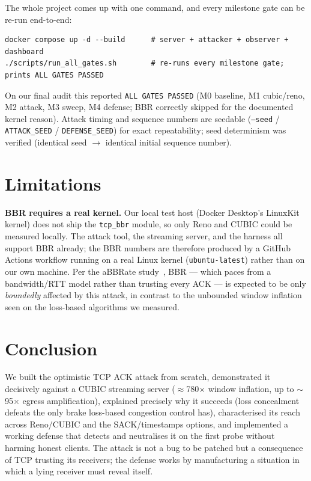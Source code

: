 \documentclass[11pt,a4paper]{article}
\begin{document}
The whole project comes up with one command, and every milestone gate can be re-run
end-to-end:
\begin{lstlisting}[style=codebox]
docker compose up -d --build      # server + attacker + observer + dashboard
./scripts/run_all_gates.sh        # re-runs every milestone gate; prints ALL GATES PASSED
\end{lstlisting}
On our final audit this reported \texttt{ALL GATES PASSED} (M0 baseline, M1 cubic/reno,
M2 attack, M3 sweep, M4 defense; BBR correctly skipped for the documented kernel reason).
Attack timing and sequence numbers are seedable (\texttt{--seed} / \texttt{ATTACK\_SEED} /
\texttt{DEFENSE\_SEED}) for exact repeatability; seed determinism was verified (identical
seed $\rightarrow$ identical initial sequence number).

\section{Limitations}
\textbf{BBR requires a real kernel.} Our local test host (Docker Desktop's LinuxKit
kernel) does not ship the \texttt{tcp\_bbr} module, so only Reno and CUBIC could be
measured locally. The attack tool, the streaming server, and the harness all support BBR
already; the BBR numbers are therefore produced by a GitHub Actions workflow running on a
real Linux kernel (\texttt{ubuntu-latest}) rather than on our own machine. Per the
aBBRate study~\cite{abbrate}, BBR --- which paces from a bandwidth/RTT model rather than
trusting every ACK --- is expected to be only \emph{boundedly} affected by this attack,
in contrast to the unbounded window inflation seen on the loss-based algorithms we
measured.

\section{Conclusion}
We built the optimistic TCP ACK attack from scratch, demonstrated it decisively against a
CUBIC streaming server ($\approx$780$\times$ window inflation, up to $\sim$95$\times$
egress amplification), explained precisely why it succeeds (loss concealment defeats the
only brake loss-based congestion control has), characterised its reach across Reno/CUBIC
and the SACK/timestamps options, and implemented a working defense that detects and
neutralises it on the first probe without harming honest clients. The attack is not a bug
to be patched but a consequence of TCP trusting its receivers; the defense works by
manufacturing a situation in which a lying receiver must reveal itself.
\end{document}
